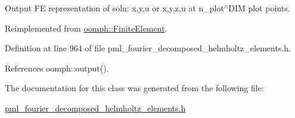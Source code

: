 Output FE representation of soln\+: x,y,u or x,y,z,u at n\+\_\+plot$^\wedge$\+D\+IM plot points. 



Reimplemented from \hyperlink{classoomph_1_1FiniteElement_afa9d9b2670f999b43e6679c9dd28c457}{oomph\+::\+Finite\+Element}.



Definition at line 964 of file pml\+\_\+fourier\+\_\+decomposed\+\_\+helmholtz\+\_\+elements.\+h.



References oomph\+::output().



The documentation for this class was generated from the following file\+:\begin{DoxyCompactItemize}
\item 
\hyperlink{pml__fourier__decomposed__helmholtz__elements_8h}{pml\+\_\+fourier\+\_\+decomposed\+\_\+helmholtz\+\_\+elements.\+h}\end{DoxyCompactItemize}

